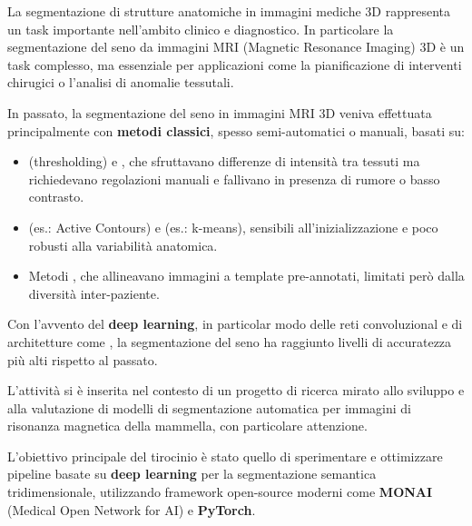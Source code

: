 
La segmentazione di strutture anatomiche in immagini mediche 3D rappresenta un task importante nell’ambito clinico e diagnostico. In particolare la segmentazione del seno da immagini MRI (Magnetic Resonance Imaging) 3D è un task complesso, ma essenziale per applicazioni come la pianificazione di interventi chirugici o l’analisi di anomalie tessutali.

In passato, la segmentazione del seno in immagini MRI 3D veniva effettuata principalmente con \textbf{metodi classici}, spesso semi-automatici o manuali, basati su:

\begin{itemize}
	\item {} (thresholding) e , che sfruttavano differenze di intensità tra tessuti ma richiedevano regolazioni manuali e fallivano in presenza di rumore o basso contrasto.
	\item {} (es.: Active Contours) e  (es.: k-means), sensibili all’inizializzazione e poco robusti alla variabilità anatomica.
	\item Metodi , che allineavano immagini a template pre-annotati, limitati però dalla diversità inter-paziente.
\end{itemize}

Con l’avvento del \textbf{deep learning}, in particolar modo delle reti convoluzional e di architetture come , la segmentazione del seno ha raggiunto livelli di accuratezza più alti rispetto al passato. 





L’attività si è inserita nel contesto di un progetto di ricerca mirato allo sviluppo e alla valutazione di modelli di segmentazione automatica per immagini di risonanza magnetica della mammella, con particolare attenzione.

L’obiettivo principale del tirocinio è stato quello di sperimentare e ottimizzare pipeline basate su \textbf{deep learning} per la segmentazione semantica tridimensionale, utilizzando framework open-source moderni come \textbf{MONAI} (Medical Open Network for AI) e \textbf{PyTorch}.

